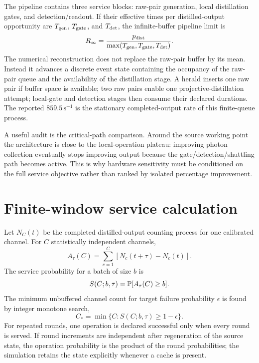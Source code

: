 \documentclass[aps,prx,preprint,superscriptaddress,nofootinbib,longbibliography]{revtex4-2}
\begin{document}
The pipeline contains three service blocks: raw-pair generation, local distillation gates, and detection/readout. If their effective times per distilled-output opportunity are $T_{\rm gen}$, $T_{\rm gate}$, and $T_{\rm det}$, the infinite-buffer pipeline limit is
\begin{equation}
 R_\infty=\frac{p_{\rm dist}}{\max(T_{\rm gen},T_{\rm gate},T_{\rm det})}.
\end{equation}
The numerical reconstruction does not replace the raw-pair buffer by its mean. Instead it advances a discrete event state containing the occupancy of the raw-pair queue and the availability of the distillation stage. A herald inserts one raw pair if buffer space is available; two raw pairs enable one projective-distillation attempt; local-gate and detection stages then consume their declared durations. The reported $859.5\,\mathrm{s}^{-1}$ is the stationary completed-output rate of this finite-queue process.

A useful audit is the critical-path comparison. Around the source working point the architecture is close to the local-operation plateau: improving photon collection eventually stops improving output because the gate/detection/shuttling path becomes active. This is why hardware sensitivity must be conditioned on the full service objective rather than ranked by isolated percentage improvement.

\section{Finite-window service calculation}
Let $N_C(t)$ be the completed distilled-output counting process for one calibrated channel. For $C$ statistically independent channels,
\begin{equation}
 A_\tau(C)=\sum_{c=1}^{C}[N_c(t+\tau)-N_c(t)] .
\end{equation}
The service probability for a batch of size $b$ is
\begin{equation}
 S(C;b,\tau)=\mathbb P[A_\tau(C)\ge b].
\end{equation}
The minimum unbuffered channel count for target failure probability $\epsilon$ is found by integer monotone search,
\begin{equation}
 C_* = \min\{C:S(C;b,\tau)\ge1-\epsilon\}.
\end{equation}
For repeated rounds, one operation is declared successful only when every round is served. If round increments are independent after regeneration of the source state, the operation probability is the product of the round probabilities; the simulation retains the state explicitly whenever a cache is present.
\end{document}
